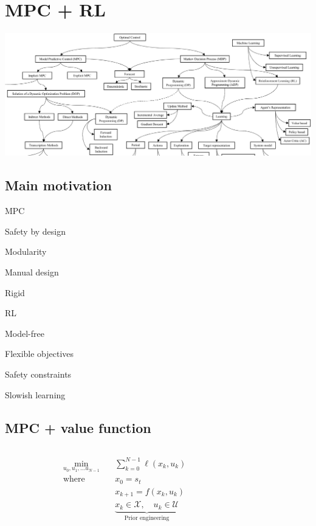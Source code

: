 \documentclass[
  letterpaper,
  DIV=11,
  numbers=noendperiod,
  oneside]{scrartcl}
\begin{document}
\section{MPC + RL}\label{mpc-rl}

\begin{center}
\includegraphics{figs/rl_mpc_tree.png}
\end{center}


\subsection{Main motivation}\label{main-motivation}

MPC

Safety by design

Modularity

Manual design

Rigid

RL

Model-free

Flexible objectives

Safety constraints

Slowish learning

\subsection{MPC + value function}\label{mpc-value-function}

\begin{align}
\min_{u_0, u_1, \ldots u_{N - 1}} \quad & \sum_{k=0}^{N-1} \ell(x_k, u_k) \phantom{\quad + \overbrace{V_{\theta}(x_N)}^{\text{Learnable residual}}}\\
\text{where }\quad & x_0 = s_t \\
& x_{k+1} = f(x_k, u_k) \\
& \underbrace{x_k \in \mathcal{X},\quad u_k \in \mathcal{U}}_{\text{Prior engineering}} \\
\end{align}
\end{document}
